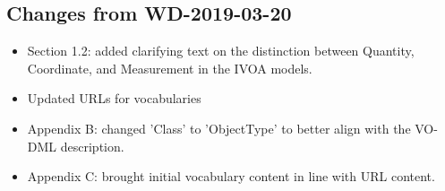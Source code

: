 \subsection{Changes from WD-2019-03-20}
\begin{itemize} 
  \item Section 1.2: added clarifying text on the distinction between Quantity, Coordinate, and Measurement in the IVOA models.
  \item Updated URLs for vocabularies
  \item Appendix B: changed 'Class' to 'ObjectType' to better align with the VO-DML description.
  \item Appendix C: brought initial vocabulary content in line with URL content.
\end{itemize}
